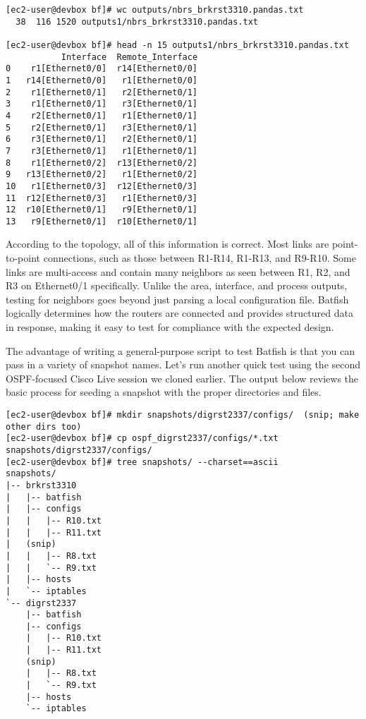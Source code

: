 \begin{verbatim}
[ec2-user@devbox bf]# wc outputs/nbrs_brkrst3310.pandas.txt
  38  116 1520 outputs1/nbrs_brkrst3310.pandas.txt

[ec2-user@devbox bf]# head -n 15 outputs1/nbrs_brkrst3310.pandas.txt
           Interface  Remote_Interface
0    r1[Ethernet0/0]  r14[Ethernet0/0]
1   r14[Ethernet0/0]   r1[Ethernet0/0]
2    r1[Ethernet0/1]   r2[Ethernet0/1]
3    r1[Ethernet0/1]   r3[Ethernet0/1]
4    r2[Ethernet0/1]   r1[Ethernet0/1]
5    r2[Ethernet0/1]   r3[Ethernet0/1]
6    r3[Ethernet0/1]   r2[Ethernet0/1]
7    r3[Ethernet0/1]   r1[Ethernet0/1]
8    r1[Ethernet0/2]  r13[Ethernet0/2]
9   r13[Ethernet0/2]   r1[Ethernet0/2]
10   r1[Ethernet0/3]  r12[Ethernet0/3]
11  r12[Ethernet0/3]   r1[Ethernet0/3]
12  r10[Ethernet0/1]   r9[Ethernet0/1]
13   r9[Ethernet0/1]  r10[Ethernet0/1]
\end{verbatim}

According to the topology, all of this information is correct. Most links are
point-to-point connections, such as those between R1-R14, R1-R13, and R9-R10.
Some links are multi-access and contain many neighbors as seen between
R1, R2, and R3 on Ethernet0/1 specifically. Unlike the area, interface,
and process outputs, testing for neighbors goes beyond just parsing a local
configuration file. Batfish logically determines how the routers are
connected and provides structured data in response, making it easy to
test for compliance with the expected design.

The advantage of writing a general-purpose script to test Batfish is that
you can pass in a variety of snapshot names. Let's run another quick
test using the second OSPF-focused Cisco Live session we cloned earlier.
The output below reviews the basic process for seeding a snapshot with
the proper directories and files.

\begin{verbatim}
[ec2-user@devbox bf]# mkdir snapshots/digrst2337/configs/  (snip; make other dirs too)
[ec2-user@devbox bf]# cp ospf_digrst2337/configs/*.txt snapshots/digrst2337/configs/
[ec2-user@devbox bf]# tree snapshots/ --charset==ascii
snapshots/
|-- brkrst3310
|   |-- batfish
|   |-- configs
|   |   |-- R10.txt
|   |   |-- R11.txt
|   (snip)
|   |   |-- R8.txt
|   |   `-- R9.txt
|   |-- hosts
|   `-- iptables
`-- digrst2337
    |-- batfish
    |-- configs
    |   |-- R10.txt
    |   |-- R11.txt
    (snip)
    |   |-- R8.txt
    |   `-- R9.txt
    |-- hosts
    `-- iptables
\end{verbatim}

